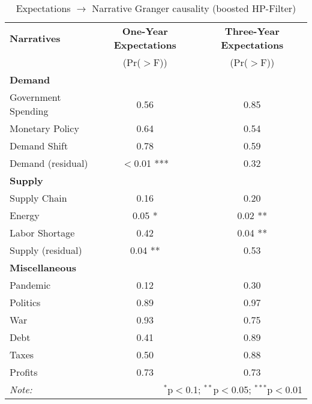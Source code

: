 \begin{table}[ht]
\centering
\caption{Expectations $\rightarrow$ Narrative Granger causality (boosted HP-Filter)}\label{tab:granger_bHP_feedback}

\begin{tabular}{lcc}
\toprule
\textbf{Narratives} & \textbf{One-Year Expectations} & \textbf{Three-Year Expectations} \\
& (Pr($>$F)) & (Pr($>$F)) \\
\midrule
\multicolumn{3}{l}{\textbf{Demand}} \\
\midrule
Government Spending & 0.56 & 0.85 \\
Monetary Policy & 0.64 & 0.54 \\
Demand Shift & 0.78 & 0.59 \\
Demand (residual) & $<$0.01 *** & 0.32 \\
\midrule
\multicolumn{3}{l}{\textbf{Supply}} \\
\midrule
Supply Chain & 0.16 & 0.20 \\
Energy & 0.05 * & 0.02 ** \\
Labor Shortage & 0.42 & 0.04 ** \\
Supply (residual) & 0.04 ** & 0.53 \\
\midrule
\multicolumn{3}{l}{\textbf{Miscellaneous}} \\
\midrule
Pandemic & 0.12 & 0.30 \\
Politics & 0.89 & 0.97 \\
War & 0.93 & 0.75 \\
Debt & 0.41 & 0.89 \\
Taxes & 0.50 & 0.88 \\
Profits & 0.73 & 0.73 \\
\midrule
\bottomrule
\textit{Note:}  & \multicolumn{2}{r}{$^{*}$p$<$0.1; $^{**}$p$<$0.05; $^{***}$p$<$0.01} \\
\bottomrule
\end{tabular}
\end{table}
